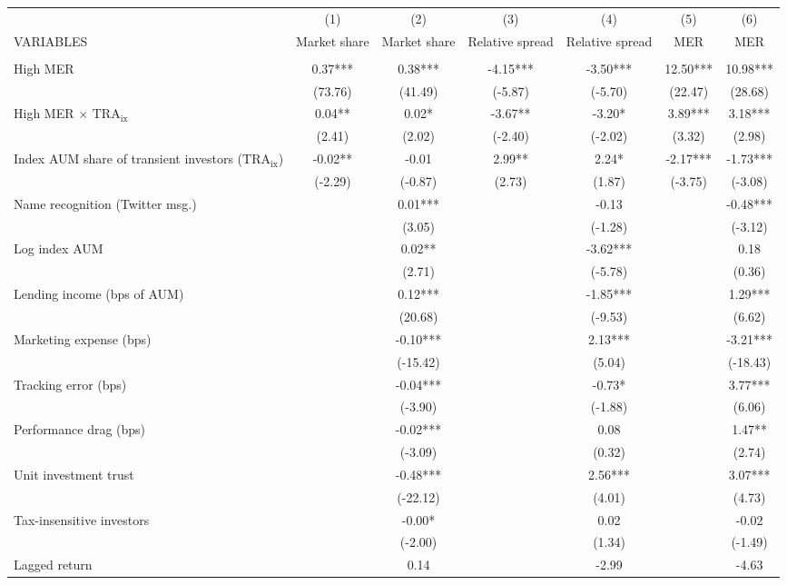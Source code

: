 \documentclass[]{article}
\begin{document}
\begin{tabular}{lcccccc} \hline
 & (1) & (2) & (3) & (4) & (5) & (6) \\
VARIABLES & Market share & Market share & Relative spread & Relative spread & MER & MER \\ \hline
 &  &  &  &  &  &  \\
High MER & 0.37*** & 0.38*** & -4.15*** & -3.50*** & 12.50*** & 10.98*** \\
 & (73.76) & (41.49) & (-5.87) & (-5.70) & (22.47) & (28.68) \\
High MER $\times$ $\text{TRA}_\text{ix}$ & 0.04** & 0.02* & -3.67** & -3.20* & 3.89*** & 3.18*** \\
 & (2.41) & (2.02) & (-2.40) & (-2.02) & (3.32) & (2.98) \\
Index AUM share of transient investors ($\text{TRA}_\text{ix}$) & -0.02** & -0.01 & 2.99** & 2.24* & -2.17*** & -1.73*** \\
 & (-2.29) & (-0.87) & (2.73) & (1.87) & (-3.75) & (-3.08) \\
Name recognition (Twitter msg.) &  & 0.01*** &  & -0.13 &  & -0.48*** \\
 &  & (3.05) &  & (-1.28) &  & (-3.12) \\
Log index AUM &  & 0.02** &  & -3.62*** &  & 0.18 \\
 &  & (2.71) &  & (-5.78) &  & (0.36) \\
Lending income (bps of AUM) &  & 0.12*** &  & -1.85*** &  & 1.29*** \\
 &  & (20.68) &  & (-9.53) &  & (6.62) \\
Marketing expense (bps) &  & -0.10*** &  & 2.13*** &  & -3.21*** \\
 &  & (-15.42) &  & (5.04) &  & (-18.43) \\
Tracking error (bps) &  & -0.04*** &  & -0.73* &  & 3.77*** \\
 &  & (-3.90) &  & (-1.88) &  & (6.06) \\
Performance drag (bps) &  & -0.02*** &  & 0.08 &  & 1.47** \\
 &  & (-3.09) &  & (0.32) &  & (2.74) \\
Unit investment trust &  & -0.48*** &  & 2.56*** &  & 3.07*** \\
 &  & (-22.12) &  & (4.01) &  & (4.73) \\
Tax-insensitive investors &  & -0.00* &  & 0.02 &  & -0.02 \\
 &  & (-2.00) &  & (1.34) &  & (-1.49) \\
Lagged return &  & 0.14 &  & -2.99 &  & -4.63 \\

\end{tabular}
\end{document}
